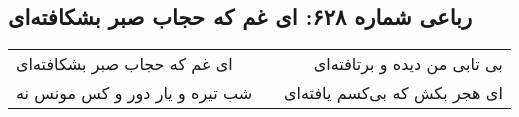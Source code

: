 \begin{center}
\section*{رباعی شماره ۶۲۸: ای غم که حجاب صبر بشکافته‌ای}
\label{sec:sh628}
\begin{longtable}{l p{0.5cm} r}
ای غم که حجاب صبر بشکافته‌ای
&&
بی تابی من دیده و برتافته‌ای
\\
شب تیره و یار دور و کس مونس نه
&&
ای هجر بکش که بی‌کسم یافته‌ای
\\
\end{longtable}
\end{center}
